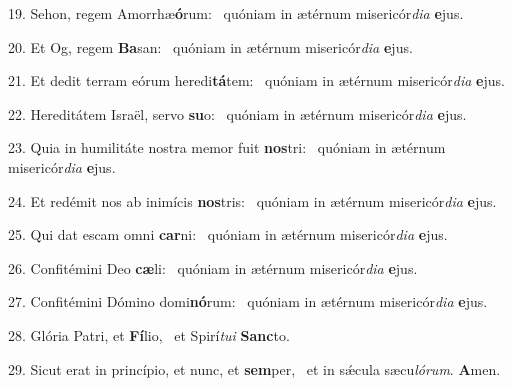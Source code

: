 19. Sehon, regem Amorrhæ\textbf{ó}rum: \ast\  quóniam in ætérnum misericór\textit{di}\textit{a} \textbf{e}jus.\

20. Et Og, regem \textbf{Ba}san: \ast\  quóniam in ætérnum misericór\textit{di}\textit{a} \textbf{e}jus.\

21. Et dedit terram eórum heredi\textbf{tá}tem: \ast\  quóniam in ætérnum misericór\textit{di}\textit{a} \textbf{e}jus.\

22. Hereditátem Israël, servo \textbf{su}o: \ast\  quóniam in ætérnum misericór\textit{di}\textit{a} \textbf{e}jus.\

23. Quia in humilitáte nostra memor fuit \textbf{nos}tri: \ast\  quóniam in ætérnum misericór\textit{di}\textit{a} \textbf{e}jus.\

24. Et redémit nos ab inimícis \textbf{nos}tris: \ast\  quóniam in ætérnum misericór\textit{di}\textit{a} \textbf{e}jus.\

25. Qui dat escam omni \textbf{car}ni: \ast\  quóniam in ætérnum misericór\textit{di}\textit{a} \textbf{e}jus.\

26. Confitémini Deo \textbf{cæ}li: \ast\  quóniam in ætérnum misericór\textit{di}\textit{a} \textbf{e}jus.\

27. Confitémini Dómino domi\textbf{nó}rum: \ast\  quóniam in ætérnum misericór\textit{di}\textit{a} \textbf{e}jus.\

28. Glória Patri, et \textbf{Fí}lio, \ast\  et Spirí\textit{tu}\textit{i} \textbf{Sanc}to.\

29. Sicut erat in princípio, et nunc, et \textbf{sem}per, \ast\  et in sǽcula sæcu\textit{ló}\textit{rum}. \textbf{A}men.\

